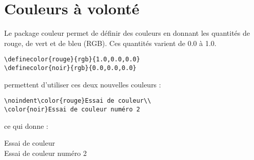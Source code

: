 \section{Couleurs à volonté}


\noindent 
Le package couleur permet de définir des couleurs en donnant les quantités de rouge, de vert
et de bleu (RGB). Ces quantités varient de 0.0 à 1.0.

\begin{lstlisting}
\definecolor{rouge}{rgb}{1.0,0.0,0.0}
\definecolor{noir}{rgb}{0.0,0.0,0.0}
\end{lstlisting}

permettent d'utiliser ces deux nouvelles couleurs :

\begin{lstlisting}
\noindent\color{rouge}Essai de couleur\\
\color{noir}Essai de couleur numéro 2
\end{lstlisting}

ce qui donne :

\noindent\color{rouge}Essai de couleur\\
\color{noir}Essai de couleur numéro 2\\
